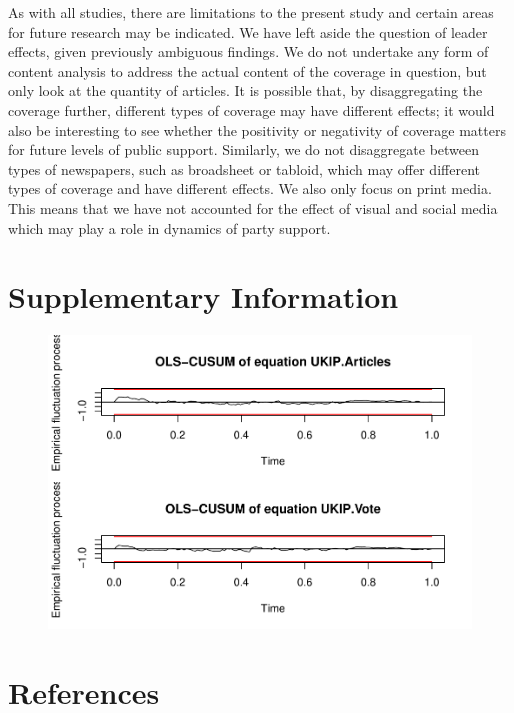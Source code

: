 \documentclass[12pt,article]{article}
\begin{document}
As with all studies, there are limitations to the present study and
certain areas for future research may be indicated. We have left aside
the question of leader effects, given previously ambiguous findings. We
do not undertake any form of content analysis to address the actual
content of the coverage in question, but only look at the quantity of
articles. It is possible that, by disaggregating the coverage further,
different types of coverage may have different effects; it would also be
interesting to see whether the positivity or negativity of coverage
matters for future levels of public support. Similarly, we do not
disaggregate between types of newspapers, such as broadsheet or tabloid,
which may offer different types of coverage and have different effects.
We also only focus on print media. This means that we have not accounted
for the effect of visual and social media which may play a role in
dynamics of party support.

\pagebreak

\section{Supplementary Information}\label{supplementary-information}

\begin{figure}[htbp]
\centering
\includegraphics{ukip_media_files/figure-latex/supplementary-1.pdf}
\caption{}
\end{figure}

\pagebreak

\section{References}\label{references}
\end{document}
